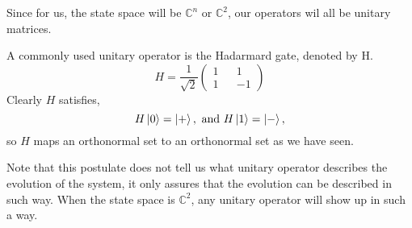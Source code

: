 Since for us, the state space will be ${\mathbb{C}}^n$ or ${\mathbb{C}}^2$, our operators wil all be unitary matrices.  

\begin{example} 
A commonly used unitary operator is the Hadarmard gate, denoted by H.  
\begin{equation}
   H=\frac{1}{\sqrt{2}}\begin{pmatrix}
1 && 1\\
1 && -1
\end{pmatrix} 
\end{equation}
Clearly $H$ satisfies,
$$H\ket{0}=\ket{+}, \textrm{ and }H\ket{1}=\ket{-},$$
so $H$ maps an orthonormal set to an orthonormal set as we have seen.

\end{example}


Note that this postulate does not tell us what unitary operator describes the evolution of the system, it only assures that the evolution can be described in such way.  When the state space is ${\mathbb{C}}^2$, any unitary operator will show up in such a way.

